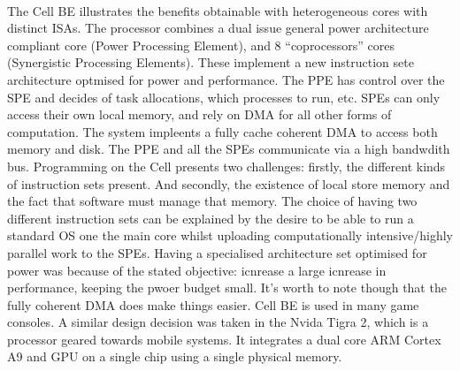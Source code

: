 \paragraph{}The Cell BE illustrates the benefits obtainable with heterogeneous
cores with distinct ISAs. The processor combines a 
dual issue general power architecture compliant core (Power Processing Element), and 8 ``coprocessors''
cores (Synergistic Processing Elements). These implement a new instruction sete
architecture optmised for power and performance.  The PPE has control over the SPE
and decides of task allocations, which processes to run, etc. SPEs can only 
access their own local memory, and rely on DMA for all other forms of computation.
The system impleents a fully cache coherent DMA to access both memory and disk. 
The PPE and all the SPEs communicate via a high bandwdith bus. 
Programming on the Cell presents two challenges: firstly, the different kinds of 
instruction sets present. And secondly, the existence of local store memory and the
fact that software must manage that memory. The choice of having two different instruction
sets can be explained by the desire to be able to run a standard OS one the main 
core whilst uploading computationally intensive/highly parallel work 
to the SPEs. Having a specialised architecture set optimised for power was
because of the stated objective: icnrease a large icnrease in performance,
keeping the pwoer budget small.  It's worth to note though that the 
fully coherent DMA does make things easier.  Cell BE is used in 
many game consoles. A similar design decision was taken in the Nvida Tigra 2, which is 
a processor geared towards mobile systems. It integrates a dual
core ARM Cortex A9 and GPU on a single chip using a single physical memory. 


